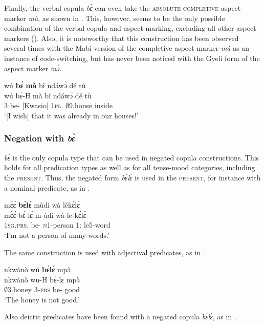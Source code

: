 Finally, the verbal copula {\itshape bɛ̀} can even take the \textsc{absolute completive} aspect marker {\itshape mà}, as shown in . This, however, seems to be the only possible combination of the verbal copula and aspect marking, excluding all other aspect markers (). Also, it is noteworthy that this construction has been observed several times with the Mabi version of the completive aspect marker {\itshape mà} as an instance of code-switching, but has never been noticed with the Gyeli form of the aspect marker {\itshape mɔ̀}.


\ea \label{bema}
  \glll  wú {\bfseries bɛ́} {\bfseries mà} bî ndáwɔ̀ dé tù \\
         wú bɛ̀-H mà bî ndáwɔ̀ dé tù \\
         3 be-{\R} {\COMPL}[Kwasio] 1\textsc{pl}.{\OBJ} $\emptyset$9.house {\LOC} inside\\
    \trans `[I wish] that it was already in our houses!'
\z

\subsubsection*{Negation with {\itshape bɛ̀}}
{\itshape bɛ̀} is the only copula type that can be used in negated copula constructions. This holds for all predication types as well as for all tense-mood categories, including the \textsc{present}. Thus, the negated form {\itshape bɛ́lɛ́} is used in the \textsc{present}, for instance with a nominal predicate, as in .

\ea \label{bele1}
  \glll  mɛ̀ɛ́ {\bfseries bɛ́lɛ́} mùdì wà lèkɛ́lɛ̀ \\
         mɛ̀ɛ́ bɛ́-lɛ́ m-ùdì wà le-kɛ́lɛ̀ \\
          1\textsc{sg}.\textsc{prs}.{\NEG} be-{\NEG} \textsc{n}1-person 1:{\ATT} le5-word\\
    \trans `I'm not a person of many words.'
\z

\noindent The same construction is used with adjectival predicates, as in .

\ea \label{bele2}
  \glll nkwànò wú {\bfseries bɛ́lɛ́} mpà \\
       nkwànò wu-H bɛ̀-lɛ mpà \\
       $\emptyset$3.honey 3-\textsc{prs} be-{\NEG} good\\
    \trans `The honey is not good.'
\z

\noindent Also deictic predicates have been found with a negated copula {\itshape bɛ́lɛ́}, as in .


